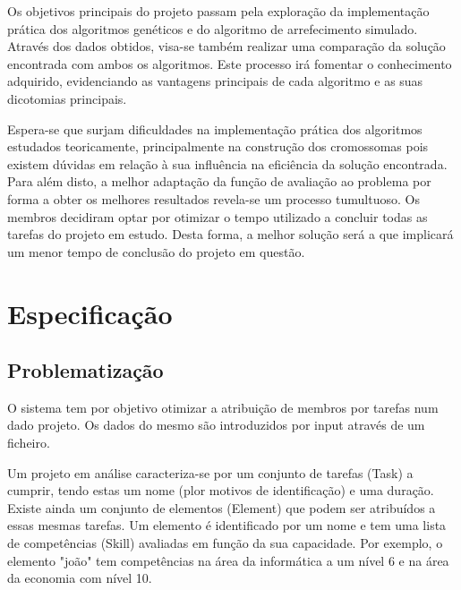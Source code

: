 \begin{titlepage}
Os objetivos principais do projeto passam pela exploração da implementação prática dos algoritmos genéticos e do algoritmo de arrefecimento simulado. Através dos dados obtidos, visa-se também realizar uma comparação da solução encontrada com ambos os algoritmos. Este processo irá fomentar o conhecimento adquirido, evidenciando as vantagens principais de cada algoritmo e as suas dicotomias principais.  

Espera-se que surjam dificuldades na implementação prática dos algoritmos estudados teoricamente, principalmente na construção dos cromossomas pois existem dúvidas em relação à sua influência na eficiência da solução encontrada. Para além disto, a melhor adaptação da função de avaliação ao problema por forma a obter os melhores resultados revela-se um processo tumultuoso. Os membros decidiram optar por otimizar o tempo utilizado a concluir todas as tarefas do projeto em estudo. Desta forma, a melhor solução será a que implicará um menor tempo de conclusão do projeto em questão.


\newpage %


\section{Especificação}

\subsection{Problematização}
\justify\normalsize
O sistema tem por objetivo otimizar a atribuição de membros por tarefas num dado projeto. Os dados do mesmo são introduzidos por input através de um ficheiro.

Um projeto em análise caracteriza-se por um conjunto de tarefas (Task) a cumprir, tendo estas um nome (plor motivos de identificação) e uma duração. Existe ainda um conjunto de elementos (Element) que podem ser atribuídos a essas mesmas tarefas. Um elemento é identificado por um nome e tem uma lista de competências (Skill) avaliadas em função da sua capacidade. Por exemplo, o elemento "joão" tem competências na área da informática a um nível 6 e na área da economia com nível 10.


\end{titlepage}
